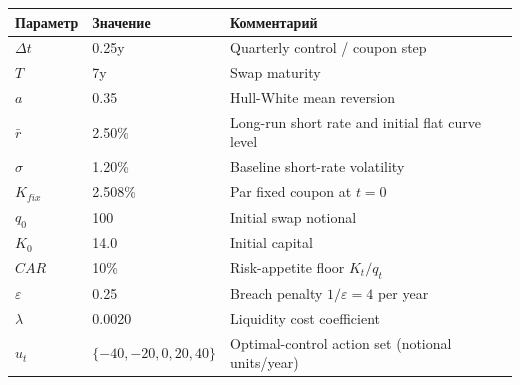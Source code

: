 \begin{tabular}{lll}
\toprule
Параметр & Значение & Комментарий \\
\midrule
$\Delta t$ & 0.25y & Quarterly control / coupon step \\
$T$ & 7y & Swap maturity \\
$a$ & 0.35 & Hull-White mean reversion \\
$\bar r$ & 2.50\% & Long-run short rate and initial flat curve level \\
$\sigma$ & 1.20\% & Baseline short-rate volatility \\
$K_{fix}$ & 2.508\% & Par fixed coupon at $t=0$ \\
$q_0$ & 100 & Initial swap notional \\
$K_0$ & 14.0 & Initial capital \\
$CAR$ & 10\% & Risk-appetite floor $K_t/q_t$ \\
$\varepsilon$ & 0.25 & Breach penalty $1/\varepsilon=4$ per year \\
$\lambda$ & 0.0020 & Liquidity cost coefficient \\
$u_t$ & $\{-40,-20,0,20,40\}$ & Optimal-control action set (notional units/year) \\
\bottomrule
\end{tabular}
